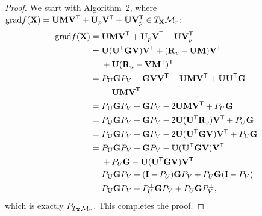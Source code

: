 \documentclass[letterpaper]{article}
\def\M{\mathcal{M}}
\def\bR{{\bf R}}
\def\U{{\bf U}}
\def\V{{\bf V}}
\def\trsp{{\sf T}}
\def\G{{\bf G}}
\def\grad{{\text{grad}}}
\def\bM{{\bf M}}
\def\bI{{\bf I}}
\def\bX{{\bf X}}
\def\bI{{\bf I}}
\def\bX{{\bf X}}
\begin{document}
\begin{proof}
  We start with Algorithm~2, where $\grad f(\bX) = \U \bM \V^{\trsp} + \U_{p} \V^{\trsp} + \U \V_{p}^{\trsp} \in T_{\bX}\M_{r}$:
  \begin{align}\label{eq:proof_lemma1}
    \grad f(\bX) & = \U \bM \V^{\trsp} + \U_{p} \V^{\trsp} + \U \V_{p}^{\trsp}  \nonumber \\
                 & = \U(\U^{\trsp} \G \V) \V^{\trsp} + (\bR_{v} - \U \bM) \V^{\trsp}  \nonumber \\
                 & ~~~~ + \U (\bR_{u} - \V \bM^{\trsp})^{\trsp} \nonumber \\
                 & = P_{\U} \G P_{V} + \G \V \V^{\trsp} - \U \bM \V^{\trsp} + \U \U^{\trsp} \G \nonumber \\
                 & ~~~~ - \U \bM \V^{\trsp} \nonumber \\
                 & = P_{\U} \G P_{V} + \G P_{V} - 2\U \bM \V^{\trsp} + P_{U} \G  \nonumber \\
                 & = P_{\U} \G P_{V} + \G P_{V} - 2\U (\U^{\trsp} \bR_{v}) \V^{\trsp} + P_{U} \G  \nonumber \\
                 & = P_{\U} \G P_{V} + \G P_{V} - 2\U (\U^{\trsp} \G \V) \V^{\trsp} + P_{U} \G  \nonumber \\
                 & = P_{\U} \G P_{V} + \G P_{V} - \U (\U^{\trsp} \G \V) \V^{\trsp}  \nonumber \\
                 & ~~~~ + P_{U} \G - \U (\U^{\trsp} \G \V) \V^{\trsp}  \nonumber \\
                 & = P_{\U} \G P_{V} + (\bI - P_{U}) \G P_{V} + P_{U} \G (\bI - P_{V})  \nonumber \\
                 & = P_{\U} \G P_{V} + P_{U}^{\perp} \G P_{V} + P_{U} \G P_{V}^{\perp}  ,
  \end{align}
  \noindent
  which is exactly $P_{T_{\bX}\M_{r}}$.
  This completes the proof.
\end{proof}





%  
%  
\end{document}
